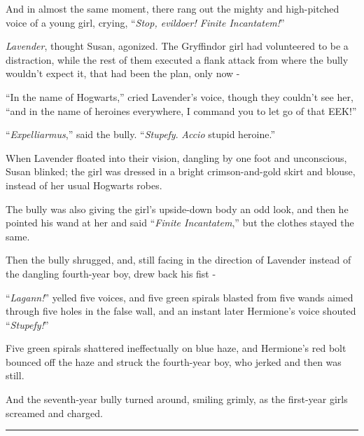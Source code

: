And in almost the same moment, there rang out the mighty and high-pitched voice of a young girl, crying, ``\emph{Stop, evildoer! Finite Incantatem!}''

\emph{Lavender}, thought Susan, agonized. The Gryffindor girl had volunteered to be a distraction, while the rest of them executed a flank attack from where the bully wouldn't expect it, that had been the plan, only now -

``In the name of Hogwarts,'' cried Lavender's voice, though they couldn't see her, ``and in the name of heroines everywhere, I command you to let go of that EEK!''

``\emph{Expelliarmus},'' said the bully. ``\emph{Stupefy}. \emph{Accio} stupid heroine.''

When Lavender floated into their vision, dangling by one foot and unconscious, Susan blinked; the girl was dressed in a bright crimson-and-gold skirt and blouse, instead of her usual Hogwarts robes.

The bully was also giving the girl's upside-down body an odd look, and then he pointed his wand at her and said ``\emph{Finite Incantatem},'' but the clothes stayed the same.

Then the bully shrugged, and, still facing in the direction of Lavender instead of the dangling fourth-year boy, drew back his fist -

``\emph{Lagann!}'' yelled five voices, and five green spirals blasted from five wands aimed through five holes in the false wall, and an instant later Hermione's voice shouted ``\emph{Stupefy!}''

Five green spirals shattered ineffectually on blue haze, and Hermione's red bolt bounced off the haze and struck the fourth-year boy, who jerked and then was still.

And the seventh-year bully turned around, smiling grimly, as the first-year girls screamed and charged.

\begin{center}\rule{3in}{0.4pt}\end{center}

